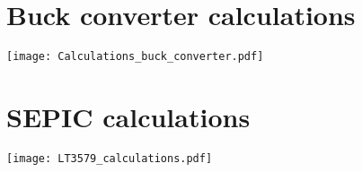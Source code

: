 \section*{Buck converter calculations} \label{Appendix_buck_calculations}
\texttt{[image: Calculations\_buck\_converter.pdf]}  


\section*{SEPIC calculations} \label{Appendix_SEPIC_calculations}
\texttt{[image: LT3579\_calculations.pdf]}
